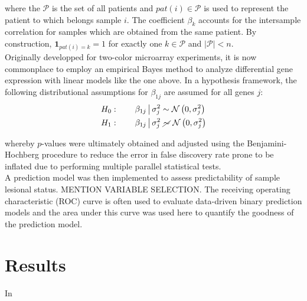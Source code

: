 \documentclass[journal, a4paper]{IEEEtran}
\def\one{\mathbf{1}}
\begin{document}
where the $\mathcal{P}$ is the set of all patients and $pat(i) \in \mathcal{P}$ is used to represent the patient to which belongs sample $i$. The coefficient $\beta_k$ accounts for the intersample correlation for samples which are obtained from the same patient. By construction, $\one_{pat(i) = k} = 1$ for exactly one $k \in \mathcal{P}$ and $\big\vert \mathcal{P}\big\vert < n$.\\

Originally developped for two-color microarray experiments, it is now commonplace to employ an empirical Bayes method to analyze differential gene expression with linear models like the one above\cite{smyth2004linear}. In a hypothesis framework, the following distributional assumptions for $\beta_{1j}$ are assumed for all genes $j$:
\begin{align*}
  H_0:\qquad \beta_{1j} \,\big\vert\, \sigma^2_j &\sim \mathcal{N}\left(0, \sigma^2_j\right)\\
  H_1:\qquad \beta_{1j} \,\big\vert\, \sigma^2_j &\,\,\cancel{\sim}\,\, \mathcal{N}\left(0, \sigma^2_j\right)
\end{align*}

whereby $p$-values were ultimately obtained and adjusted using the Benjamini-Hochberg procedure to reduce the error in false discovery rate prone to be inflated due to performing multiple parallel statistical tests\cite{benjamini2010discovering}.\\

A prediction model was then implemented to assess predictability of sample lesional status. MENTION VARIABLE SELECTION. The receiving operating characteristic (ROC) curve is often used to evaluate data-driven binary prediction models and the area under this curve was used here to quantify the goodness of the prediction model\cite{hanley1982meaning}.\\

\section{Results}

In 
\end{document}
